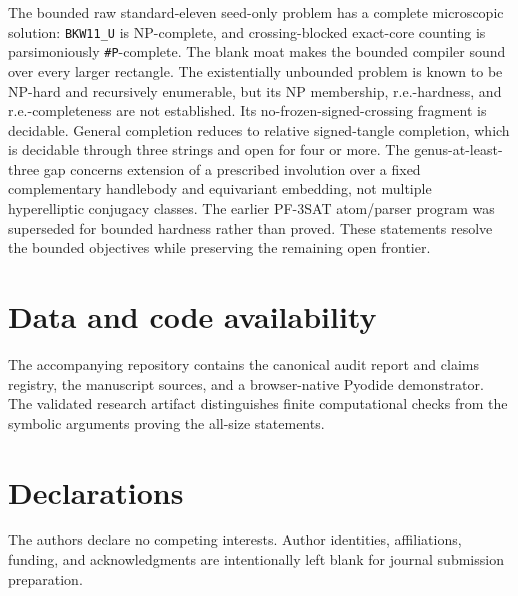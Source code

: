 \documentclass[11pt]{article}
\begin{document}
The bounded raw standard-eleven seed-only problem has a complete microscopic
solution: \texttt{BKW11\_U} is NP-complete, and crossing-blocked exact-core counting is
parsimoniously \texttt{\#P}-complete.  The blank moat makes the bounded compiler sound
over every larger rectangle.  The existentially unbounded problem is known to
be NP-hard and recursively enumerable, but its NP membership, r.e.-hardness,
and r.e.-completeness are not established.  Its no-frozen-signed-crossing
fragment is decidable.  General completion reduces to relative signed-tangle
completion, which is decidable through three strings and open for four or
more.  The genus-at-least-three gap concerns extension of a prescribed
involution over a fixed complementary handlebody and equivariant embedding,
not multiple hyperelliptic conjugacy classes.  The earlier PF-3SAT atom/parser
program was superseded for bounded hardness rather than proved.  These
statements resolve the bounded objectives while preserving the remaining open
frontier.
\section*{Data and code availability}
The accompanying repository contains the canonical audit report and claims registry, the manuscript sources, and a browser-native Pyodide demonstrator. The validated research artifact distinguishes finite computational checks from the symbolic arguments proving the all-size statements.
\section*{Declarations}
The authors declare no competing interests. Author identities, affiliations, funding, and acknowledgments are intentionally left blank for journal submission preparation.
\nocite{LomonacoKauffman2008,Plesnik1979,TamassiaTollis1989,HassLagariasPippenger1999,MITHardness2024,Fox1948,BirmanHilden1971,BirmanHilden1973,MorganBass1984,MatousekEtAl2018,NogueiraSalgueiro2022,PantaleoniPiergallini2008}


\end{document}
